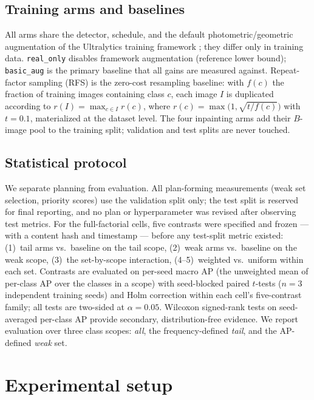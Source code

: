 \documentclass[preprint,12pt,authoryear]{elsarticle}
\begin{document}
\subsection{Training arms and baselines}\label{sec:arms}

All arms share the detector, schedule, and the default
photometric/geometric augmentation of the Ultralytics training framework
\citep{jocher2023ultralytics}; they differ only in training data.
\texttt{real\_only} disables framework augmentation (reference lower
bound); \texttt{basic\_aug} is the primary baseline that all gains are
measured against. Repeat-factor sampling (RFS) is the zero-cost
resampling baseline: with $f(c)$ the fraction of training images
containing class $c$, each image $I$ is duplicated according to
$r(I) = \max_{c \in I} r(c)$, where
$r(c) = \max\!\bigl(1, \sqrt{t/f(c)}\bigr)$ with $t = 0.1$, materialized
at the dataset level. The four inpainting arms add their $B$-image pool
to the training split; validation and test splits are never touched.

\subsection{Statistical protocol}\label{sec:stats}

We separate planning from evaluation. All plan-forming measurements
(weak set selection, priority scores) use the validation split only; the
test split is reserved for final reporting, and no plan or
hyperparameter was revised after observing test metrics. For the
full-factorial cells, five contrasts were specified and frozen --- with
a content hash and timestamp --- before any test-split metric existed:
(1)~tail arms vs.\ baseline on the tail scope, (2)~weak arms vs.\
baseline on the weak scope, (3)~the set-by-scope interaction,
(4--5)~weighted vs.\ uniform within each set. Contrasts are evaluated on
per-seed macro AP (the unweighted mean of per-class AP over the classes
in a scope) with seed-blocked paired $t$-tests ($n = 3$ independent
training seeds) and Holm correction \citep{holm1979simple} within each
cell's five-contrast family; all tests are two-sided at $\alpha = 0.05$.
Wilcoxon signed-rank tests on seed-averaged per-class AP provide
secondary, distribution-free evidence. We report evaluation over three
class scopes: \emph{all}, the frequency-defined \emph{tail}, and the
AP-defined \emph{weak} set.

\section{Experimental setup}\label{sec:setup}
\end{document}
